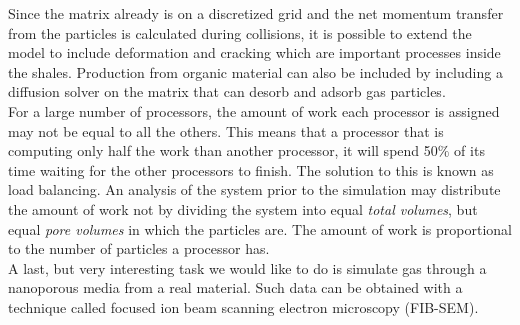 Since the matrix already is on a discretized grid and the net momentum transfer from the particles is calculated during collisions, it is possible to extend the model to include deformation and cracking which are important processes inside the shales. Production from organic material can also be included by including a diffusion solver on the matrix that can desorb and adsorb gas particles.\\
For a large number of processors, the amount of work each processor is assigned may not be equal to all the others. This means that a processor that is computing only half the work than another processor, it will spend 50$\%$ of its time waiting for the other processors to finish. The solution to this is known as load balancing. An analysis of the system prior to the simulation may distribute the amount of work not by dividing the system into equal \textit{total volumes}, but equal \textit{pore volumes} in which the particles are. The amount of work is proportional to the number of particles a processor has.\\
A last, but very interesting task we would like to do is simulate gas through a nanoporous media from a real material. Such data can be obtained with a technique called focused ion beam scanning electron microscopy (FIB-SEM).